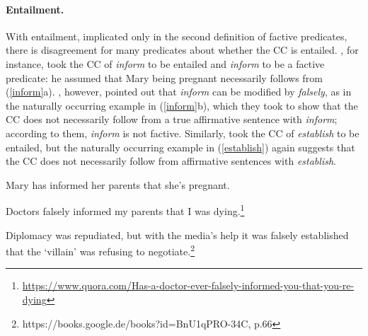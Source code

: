 \documentclass[11pt,fleqn]{article}
\newcommand{\6}{\mbox{$[\hspace*{-.6mm}[$}}
\newcommand{\9}{\mbox{$]\hspace*{-.6mm}]$}}
\begin{document}
\paragraph{Entailment.} With entailment, implicated only in the second definition of factive predicates, there is disagreement for many predicates about whether the CC is entailed. \citet[139]{schlenker10}, for instance, took the CC of {\em inform} to be entailed and {\em inform} to be a factive predicate: he assumed that Mary being pregnant necessarily follows from (\ref{inform}a). \citet[76]{anand-hacquard2014}, however, pointed out that {\em inform} can be modified by {\em falsely}, as in the naturally occurring example in (\ref{inform}b), which they took to show that the CC does not necessarily follow from a true affirmative sentence with {\em inform}; according to them, {\em inform} is not factive. Similarly, \citet{swanson2012} took the CC of {\em establish} to be entailed, but the naturally occurring example in (\ref{establish}) again suggests that the CC does not necessarily follow from affirmative sentences with {\em establish}.

\begin{exe}
\ex\label{inform} 

\begin{xlist}

\ex Mary has informed her parents that she's pregnant.

\ex Doctors falsely informed my parents that I was dying.\footnote{\url{https://www.quora.com/Has-a-doctor-ever-falsely-informed-you-that-you-re-dying}}

\end{xlist}

\ex\label{establish} Diplomacy was repudiated, but with the media's help it was falsely established that the `villain' was refusing to negotiate.\footnote{https://books.google.de/books?id=BnU1qPRO-34C, p.66}
\end{exe}



\end{document}

